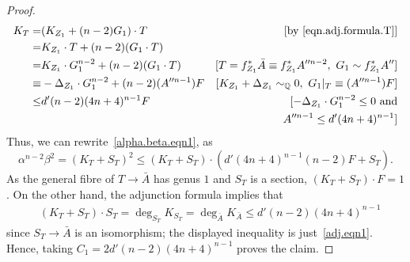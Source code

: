 \documentclass[11pt]{ip-journal}
\theoremstyle{definition}
\newcommand{\bQ}{\mathbb{Q}}
\begin{document}
\begin{proof}
\begin{align}
 K_T=  
 & 
 (K_{Z_1}+(n-2)G_1) \cdot  T 
 &  
[\text{by } \eqref{eqn.adj.formula.T}]\\
\nonumber  
= 
& 
K_{Z_1} \cdot T +(n-2)(G_1 \cdot  T) 
&  
\\
\label{adj.eqn.2} 
= & 
K_{Z_1} \cdot G_1^{n-2} +(n-2)(G_1 \cdot  T) &  
[T=f_{Z_1}^\ast \bar{A}\equiv f_{Z_1}^\ast A''^{n-2} , \ G_1 \sim f_{Z_1}^\ast A''] \\
\nonumber
\equiv & 
-\Delta_{Z_1} \cdot G_1^{n-2} + (n-2)(A''^{n-1}) F & 
[K_{Z_1} + \Delta_{Z_1} \sim_\bQ 0, \ G_1|_{T} \equiv (A''^{n-1}) F]\\
\nonumber 
\leq & 
 d'(n-2)(4n+4)^{n-1}F & 
[-\Delta_{Z_1} \cdot G_1^{n-2} \leq 0 \ \text{and}\\
\nonumber && A''^{n-1} \leq d'(4n+4)^{n-1}]
\end{align}
Thus, we can rewrite~\eqref{alpha.beta.eqn1}, as
\[
\alpha^{n-2} \beta^2 =  
(K_{T}+S_{T})^2 \leq (K_{T}+S_{T}) \cdot (d'(4n+4)^{n-1}(n-2)F + S_T).
\]
As the general fibre of $T \to \bar{A}$ has genus $1$ and $S_T$ is a section, $(K_{T}+S_{T}) \cdot F = 1$.
On the other hand, the adjunction formula implies that
\begin{align*}
& (K_{T}+S_{T}) \cdot S_T =
 \deg_{S_T} K_{S_T} = 
 \deg_{\bar{A}} K_{\bar{A}} \leq 
d'(n-2)(4n+4)^{n-1}
\end{align*}
since $S_T \to \bar{A}$ is an isomorphism; the displayed inequality is just~\eqref{adj.eqn1}.
Hence, taking $C_1 = 2d'(n-2)(4n+4)^{n-1}$ proves the claim. 

\medskip


\end{proof}
\end{document}
